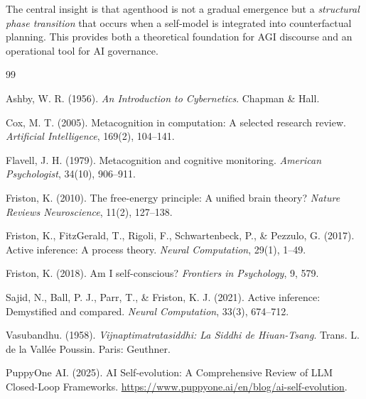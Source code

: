 \documentclass[11pt,a4paper]{article}
\begin{document}
The central insight is that agenthood is not a gradual emergence but a \emph{structural phase transition} that occurs when a self-model is integrated into counterfactual planning. This provides both a theoretical foundation for AGI discourse and an operational tool for AI governance.


\begin{thebibliography}{99}

Ashby, W. R. (1956). \textit{An Introduction to Cybernetics}. Chapman \& Hall.

Cox, M. T. (2005). Metacognition in computation: A selected research review. \textit{Artificial Intelligence}, 169(2), 104--141.

Flavell, J. H. (1979). Metacognition and cognitive monitoring. \textit{American Psychologist}, 34(10), 906--911.

Friston, K. (2010). The free-energy principle: A unified brain theory? \textit{Nature Reviews Neuroscience}, 11(2), 127--138.

Friston, K., FitzGerald, T., Rigoli, F., Schwartenbeck, P., \& Pezzulo, G. (2017). Active inference: A process theory. \textit{Neural Computation}, 29(1), 1--49.

Friston, K. (2018). Am I self-conscious? \textit{Frontiers in Psychology}, 9, 579.

Sajid, N., Ball, P. J., Parr, T., \& Friston, K. J. (2021). Active inference: Demystified and compared. \textit{Neural Computation}, 33(3), 674--712.

Vasubandhu. (1958). \textit{Vijnaptimatratasiddhi: La Siddhi de Hiuan-Tsang}. Trans. L. de la Vall{\'e}e Poussin. Paris: Geuthner.

PuppyOne AI. (2025). AI Self-evolution: A Comprehensive Review of LLM Closed-Loop Frameworks. \url{https://www.puppyone.ai/en/blog/ai-self-evolution}.

\end{thebibliography}
\end{document}
